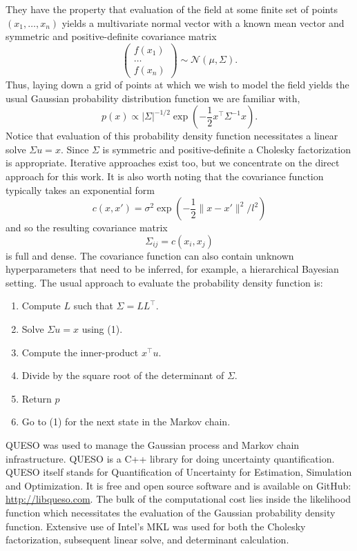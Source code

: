They have the property that evaluation of the field at some finite set of
points $(x_1, \ldots, x_n)$ yields a multivariate normal vector with a known
mean vector and symmetric and positive-definite covariance matrix
\begin{equation}
  \begin{pmatrix}
    f(x_1) \\
    \hdots \\
    f(x_n)
  \end{pmatrix}
  \sim \mathcal{N}(\mu, \Sigma).
\end{equation}
Thus, laying down a grid of points at which we wish to model the field yields
the usual Gaussian probability distribution function we are familiar with,
\begin{equation}
  p(x) \propto |\Sigma|^{-1/2} \exp(-\frac12 x^\top \Sigma^{-1} x).
\end{equation}
Notice that evaluation of this probability density function necessitates a
linear solve $\Sigma u = x$.  Since $\Sigma$ is symmetric and positive-definite
a Cholesky factorization is appropriate.  Iterative approaches exist too, but we
concentrate on the direct approach for this work.  It is also worth noting that the
covariance function typically takes an exponential form
\begin{equation}
  c(x, x') = \sigma^2 \exp(-\frac12 \| x - x' \|^2 / l^2)
\end{equation}
and so the resulting covariance matrix
\begin{equation}
  \Sigma_{ij} = c(x_i, x_j)
\end{equation}
is full and dense.  The covariance function can also contain
unknown hyperparameters
that need to be inferred, for example, a hierarchical
Bayesian setting.  The usual approach to evaluate the
probability density function is:
\begin{enumerate}
  \item Compute $L$ such that $\Sigma = LL^\top$.
  \item Solve $\Sigma u = x$ using (1).
  \item Compute the inner-product $x^\top u$.
  \item Divide by the square root of the determinant of $\Sigma$.
  \item Return $p$
  \item Go to (1) for the next state in the Markov chain.
\end{enumerate}

QUESO was used to manage the Gaussian process and Markov chain infrastructure.
QUESO is a C++ library for doing uncertainty quantification.  QUESO itself
stands for Quantification of Uncertainty for Estimation, Simulation and
Optimization.  It is free and open source software and is available on GitHub:
\url{http://libqueso.com}.  The bulk of the computational cost lies inside the
likelihood function which necessitates the evaluation of the Gaussian
probability density function.  Extensive use of Intel's MKL was used for both
the Cholesky factorization, subsequent linear solve, and determinant
calculation.

